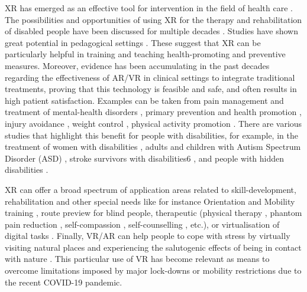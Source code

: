 \documentclass[11pt,english]{nik}
\begin{document}
XR has emerged as an effective tool for intervention in the field of health care  \autocite{mesa-gresa-effectiveness-2018}. 
The possibilities and opportunities of using XR for the therapy and rehabilitation
of disabled people have been discussed for multiple decades \autocite{kuhlen1995virtual,wilson1997virtual}.
Studies have shown great potential in pedagogical settings \autocite{akcayir2017advantages,bacca2014augmented,koutromanos2015the}. 
These suggest that XR can be particularly helpful in training and teaching health-promoting and preventive measures. Moreover, evidence has been
accumulating in the past decades regarding the effectiveness of AR/VR in clinical settings to integrate traditional
treatments, proving that this technology is feasible and safe, and often results in high patient satisfaction. Examples
can be taken from pain management and treatment of mental-health disorders \autocite{white2018a,dascal2017virtual}, 
primary prevention and health promotion \autocite{jerdan2018head,litleskare2020enable},
injury avoidance \autocite{omaki2017systematic}, weight control \autocite{fox2009virtual}, 
physical activity promotion \autocite{calogiuri-litleskare-macintyre-virtualexperiences-2019}.
There are various studies that highlight this benefit for people with disabilities, for example, in the treatment of women
with disabilities \autocite{nosek2016an}, adults
and children with Autism Spectrum Disorder (ASD) \autocite{newbutt2017the,cai2013design}, 
stroke survivors with disabilities6 \autocite{badia2016virtual}, 
and people with hidden disabilities \autocite{poyade2017using,poyade2019isensevr}. 

XR can offer a broad spectrum of application
areas \autocite{mott2019accessible} related to
skill-development, rehabilitation and other special needs like for instance Orientation and Mobility
training \autocite{zhao2018enabling}, route preview for blind people, therapeutic (physical
therapy \autocite{gonzalezfranco2014empowering}, phantom pain reduction \autocite{you2005virtual}, 
self-compassion \autocite{falconer2014embodying},
self-counselling \autocite{osimo2015conversations}, etc.), 
or virtualisation of digital tasks \autocite{mott2019accessible}. 
Finally, VR/AR can help
people to cope with stress by virtually visiting natural places and experiencing the salutogenic effects of being in
contact with nature \autocite{white2018a,litleskare2020enable}.
This particular use of VR has become relevant as means to overcome limitations imposed by major lock-downs or
mobility restrictions due to the recent COVID-19 pandemic. 
\end{document}
